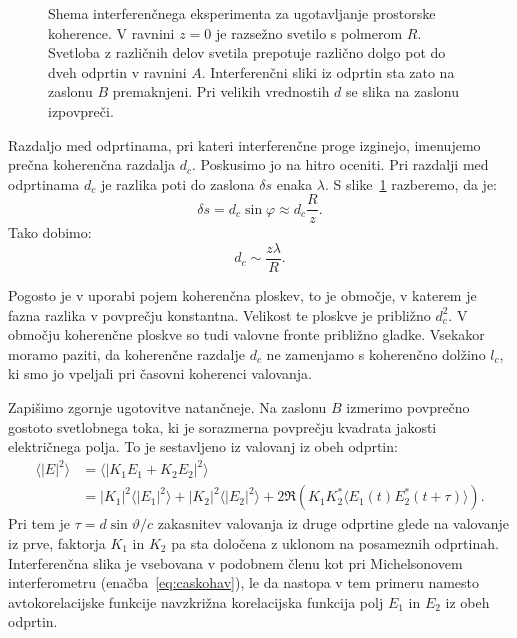 \begin{figure}[ht]
\centering
\def\svgwidth{123truemm} 

\caption{Shema interferenčnega eksperimenta za ugotavljanje prostorske koherence. 
V ravnini $z=0$ je razsežno svetilo s polmerom $R$. 
Svetloba z različnih delov svetila prepotuje različno dolgo pot do dveh odprtin 
v ravnini $A$. Interferenčni sliki iz odprtin sta zato na zaslonu $B$ premaknjeni.
Pri velikih vrednostih $d$ se slika na zaslonu izpovpreči.}
\label{fig:shema-interferenca}
\end{figure}

Razdaljo med odprtinama, pri kateri interferenčne proge
izginejo, imenujemo prečna koherenčna razdalja $d_c$. 
Poskusimo jo na hitro oceniti. Pri razdalji med odprtinama $d_c$ je razlika poti do zaslona $\delta s$
enaka $\lambda$. S slike~\ref{fig:shema-interferenca} razberemo, da je:
\begin{equation}
\delta s = d_c\sin\varphi\approx d_c\frac{R}{z}.
\end{equation}
Tako dobimo:
\begin{equation}
d_{c}\sim\frac{z\lambda}{R}.
\label{eq:prost_koh}
\end{equation}
\begin{remark}
Pogosto je v uporabi
pojem koherenčna ploskev, to je območje, 
v katerem je fazna razlika v povprečju konstantna. Velikost te ploskve je približno $d_{c}^{2}$.
V območju koherenčne ploskve so tudi valovne fronte približno gladke.
Vsekakor moramo paziti, da koherenčne razdalje $d_c$ ne zamenjamo
s koherenčno dolžino $l_c$, ki smo jo vpeljali pri časovni koherenci valovanja. 
\end{remark}

Zapišimo zgornje ugotovitve natančneje. Na zaslonu $B$
izmerimo povprečno gostoto svetlobnega toka, ki je sorazmerna povprečju kvadrata
jakosti električnega polja. To je sestavljeno iz valovanj iz obeh odprtin:
\begin{align}
\langle|E|^{2}\rangle & =\langle|K_{1}E_{1}+K_{2}E_{2}|^{2}\rangle\nonumber \\
&=  |K_{1}|^{2}\langle|E_{1}|^{2}\rangle+|K_{2}|^{2}\langle|E_{2}|^{2}\rangle+
2\Re \left( K_{1}K_{2}^{*}\langle E_{1}(t)E_{2}^{*}(t+\tau)\rangle\right)\!\!.
\end{align}
Pri tem je $\tau=d\sin\vartheta/c$ zakasnitev valovanja iz druge odprtine
glede na valovanje iz prve, faktorja $K_{1}$ in $K_{2}$ pa sta določena
z uklonom na posameznih odprtinah. Interferenčna slika je vsebovana v podobnem 
členu kot pri Michelsonovem interferometru (enačba~\ref{eq:caskohav}), 
le da nastopa v tem primeru namesto avtokorelacijske funkcije
navzkrižna korelacijska funkcija polj $E_{1}$ in $E_{2}$ iz obeh 
odprtin. 

